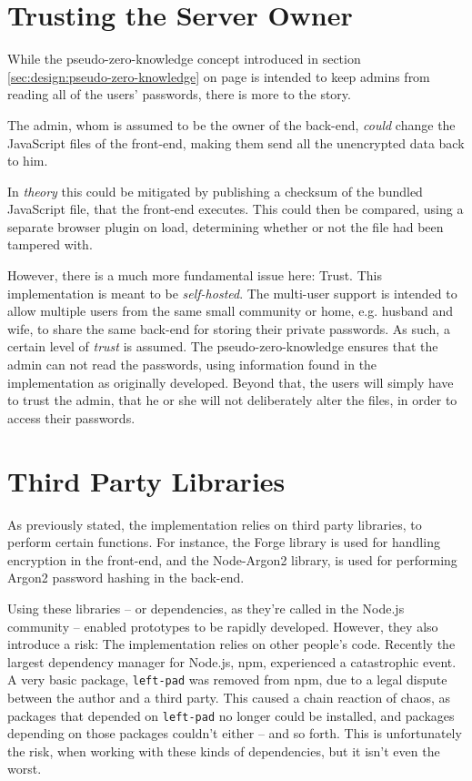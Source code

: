 	\section{Trusting the Server Owner}
		While the pseudo-zero-knowledge concept introduced in section \ref{sec:design:pseudo-zero-knowledge} on page \pageref{sec:design:pseudo-zero-knowledge} is intended to keep admins from reading all of the users' passwords, there is more to the story.

		The admin, whom is assumed to be the owner of the back-end, \emph{could} change the JavaScript files of the front-end, making them send all the unencrypted data back to him. 

		In \emph{theory} this could be mitigated by publishing a checksum of the bundled JavaScript file, that the front-end executes. This could then be compared, using a separate browser plugin on load, determining whether or not the file had been tampered with.

		However, there is a much more fundamental issue here: Trust. This implementation is meant to be \emph{self-hosted}. The multi-user support is intended to allow multiple users from the same small community or home, e.g. husband and wife, to share the same back-end for storing their private passwords. As such, a certain level of \emph{trust} is assumed. The pseudo-zero-knowledge ensures that the admin can not read the passwords, using information found in the implementation as originally developed. Beyond that, the users will simply have to trust the admin, that he or she will not deliberately alter the files, in order to access their passwords.

	\section{Third Party Libraries}
		As previously stated, the implementation relies on third party libraries, to perform certain functions. For instance, the Forge library is used for handling encryption in the front-end, and the Node-Argon2 library, is used for performing Argon2 password hashing in the back-end. 

		Using these libraries -- or dependencies, as they're called in the Node.js community -- enabled prototypes to be rapidly developed. However, they also introduce a risk: The implementation relies on other people's code. Recently the largest dependency manager for Node.js, npm, experienced a catastrophic event. A very basic package, \verb=left-pad= was removed from npm, due to a legal dispute between the author and a third party\cite{npm_leftpad}. This caused a chain reaction of chaos, as packages that depended on \verb=left-pad= no longer could be installed, and packages depending on those packages couldn't either -- and so forth. This is unfortunately the risk, when working with these kinds of dependencies, but it isn't even the worst.

